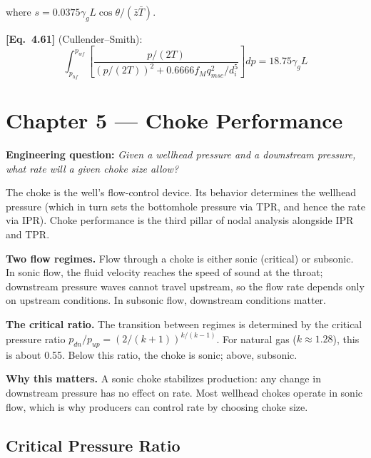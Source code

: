 \documentclass[11pt,a4paper,openany]{book}
\newcommand{\eqrefbook}[1]{\textcolor{blue!60!black}{\textbf{[Eq.~#1]}}}
\begin{document}
where $s = 0.0375 \gamma_g L\cos\theta/(\bar{z}\bar{T})$.

\eqrefbook{4.61} (Cullender--Smith):
\begin{equation}
  \int_{p_{hf}}^{p_{wf}}\left[\frac{p/(2T)}{(p/(2T))^2 + 0.6666 f_M q_{msc}^2/d_i^5}\right]dp
  = 18.75\gamma_g L
\end{equation}

\chapter{Chapter 5 — Choke Performance}

\begin{purpose}
\textbf{Engineering question:} \emph{Given a wellhead pressure and a
downstream pressure, what rate will a given choke size allow?}

The choke is the well's flow-control device. Its behavior determines
the wellhead pressure (which in turn sets the bottomhole pressure via
TPR, and hence the rate via IPR). Choke performance is the third pillar
of nodal analysis alongside IPR and TPR.
\end{purpose}

\begin{theory}
\textbf{Two flow regimes.} Flow through a choke is either sonic
(critical) or subsonic. In sonic flow, the fluid velocity reaches the
speed of sound at the throat; downstream pressure waves cannot travel
upstream, so the flow rate depends only on upstream conditions. In
subsonic flow, downstream conditions matter.

\textbf{The critical ratio.} The transition between regimes is
determined by the critical pressure ratio $p_{dn}/p_{up} = (2/(k+1))^{k/(k-1)}$.
For natural gas ($k \approx 1.28$), this is about 0.55. Below this
ratio, the choke is sonic; above, subsonic.

\textbf{Why this matters.} A sonic choke stabilizes production: any
change in downstream pressure has no effect on rate. Most wellhead
chokes operate in sonic flow, which is why producers can control rate
by choosing choke size.
\end{theory}

\section{Critical Pressure Ratio}
\end{document}
